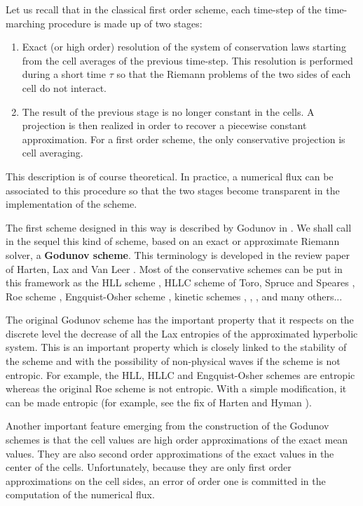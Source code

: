 \documentclass{fldauth}
\theoremstyle{plain}
\theoremstyle{plain}
\theoremstyle{plain}
\theoremstyle{plain}
\theoremstyle{plain}
\theoremstyle{plain}
\begin{document}
Let us recall that in the classical first order scheme, each time-step of the
time-marching procedure is made up of two stages:

\begin{enumerate}
\item Exact (or high order) resolution of the system of conservation laws starting
from the cell averages of the previous time-step. This resolution is performed
during a short time \( \tau  \) so that the Riemann problems of the two sides
of each cell do not interact.
\item The result of the previous stage is no longer constant in the cells. A projection
is then realized in order to recover a piecewise constant approximation. For
a first order scheme, the only conservative projection is cell averaging.
\end{enumerate}
This description is of course theoretical. In practice, a numerical flux can
be associated to this procedure so that the two stages become transparent in
the implementation of the scheme.

The first scheme designed in this way is described by Godunov in
\cite{godunov59}. We shall call in the sequel this kind of scheme,
based on an exact or approximate Riemann solver, a \textbf{Godunov
scheme}. This terminology is developed in the review paper of
Harten, Lax and Van Leer \cite{harten_lax_vanleer_83}. Most of the
conservative schemes can be put in this framework as the HLL
scheme \cite{harten_lax_vanleer_83}, HLLC scheme of Toro, Spruce
and Speares \cite{toro94}, Roe scheme \cite{roe81}, Engquist-Osher
scheme \cite{osher81}, kinetic schemes \cite{deshpande88},
\cite{perthame90}, \cite{mazet89}, and many others...

The original Godunov scheme has the important property that it
respects on the discrete level the decrease of all the Lax
entropies of the approximated hyperbolic system. This is an
important property which is closely linked to the stability of the
scheme and with the possibility of non-physical waves if the
scheme is not entropic. For example, the HLL, HLLC and
Engquist-Osher schemes are entropic whereas the original Roe
scheme is not entropic. With a simple modification, it can be made
entropic (for example, see the fix of Harten and Hyman
\cite{harten83}).

Another important feature emerging from the construction of the
Godunov schemes is that the cell values are high order
approximations of the exact mean values. They are also second
order approximations of the exact values in the center of the
cells. Unfortunately, because they are only first order
approximations on the cell sides, an error of order one is
committed in the computation of the numerical flux.
\end{document}
